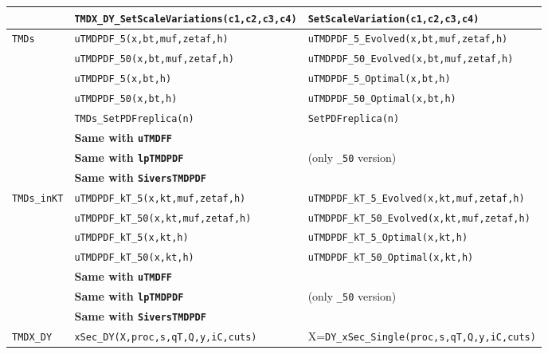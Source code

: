 \documentclass[prd,nofootinbib,eqsecnum,final]{revtex4}
\renewcommand{\(}{\left(}
\renewcommand{\)}{\right)}
\renewcommand{\[}{\left[}
\renewcommand{\]}{\right]}
\newcommand{\blue}[1]{{\color{blue} #1}}
\begin{document}
\begin{center}
\begin{longtable}{|l|l||p{6cm}|}
\\\cline{2-3}
& \texttt{TMDX\_DY\_SetScaleVariations(c1,c2,c3,c4)} & \texttt{SetScaleVariation(c1,c2,c3,c4)} 
\\\hline
\texttt{TMDs} & \texttt{uTMDPDF\_5(x,bt,muf,zetaf,h)} & \texttt{uTMDPDF\_5\_Evolved(x,bt,muf,zetaf,h)} 
\\\cline{2-3}
& \texttt{uTMDPDF\_50(x,bt,muf,zetaf,h)} & \texttt{uTMDPDF\_50\_Evolved(x,bt,muf,zetaf,h)} 
\\\cline{2-3}
& \texttt{uTMDPDF\_5(x,bt,h)} & \texttt{uTMDPDF\_5\_Optimal(x,bt,h)} 
\\\cline{2-3}
& \texttt{uTMDPDF\_50(x,bt,h)} & \texttt{uTMDPDF\_50\_Optimal(x,bt,h)} 
\\\cline{2-3}
& \texttt{TMDs\_SetPDFreplica(n)} & \texttt{SetPDFreplica(n)} 
\\\cline{2-3} & \textbf{\blue{Same with \texttt{uTMDFF}}} &
\\\cline{2-3} & \textbf{\blue{Same with \texttt{lpTMDPDF}}} & (only \texttt{\_50} version)
\\\cline{2-3} & \textbf{\blue{Same with \texttt{SiversTMDPDF}}} &
\\\hline
\texttt{TMDs\_inKT} & \texttt{uTMDPDF\_kT\_5(x,kt,muf,zetaf,h)} & \texttt{uTMDPDF\_kT\_5\_Evolved(x,kt,muf,zetaf,h)} 
\\\cline{2-3}
& \texttt{uTMDPDF\_kT\_50(x,kt,muf,zetaf,h)} & \texttt{uTMDPDF\_kT\_50\_Evolved(x,kt,muf,zetaf,h)} 
\\\cline{2-3}
& \texttt{uTMDPDF\_kT\_5(x,kt,h)} & \texttt{uTMDPDF\_kT\_5\_Optimal(x,kt,h)} 
\\\cline{2-3}
& \texttt{uTMDPDF\_kT\_50(x,kt,h)} & \texttt{uTMDPDF\_kT\_50\_Optimal(x,kt,h)} 
\\\cline{2-3} & \textbf{\blue{Same with \texttt{uTMDFF}}} &
\\\cline{2-3} & \textbf{\blue{Same with \texttt{lpTMDPDF}}} & (only \texttt{\_50} version)
\\\cline{2-3} & \textbf{\blue{Same with \texttt{SiversTMDPDF}}} &
\\\hline
\texttt{TMDX\_DY} & \texttt{xSec\_DY(X,proc,s,qT,Q,y,iC,cuts)} & X=\texttt{DY\_xSec\_Single(proc,s,qT,Q,y,iC,cuts)}
\\\cline{2-3}

\end{longtable}
\end{center}
\end{document}

